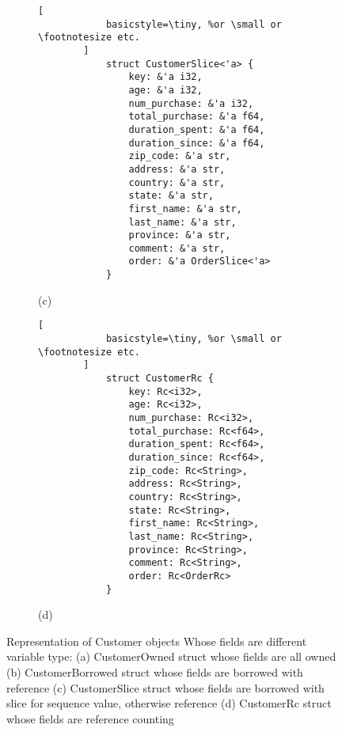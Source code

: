 \begin{figure}[htb]
    \begin{subfigure}{.5\textwidth}\centering
        \begin{lstlisting}[
            basicstyle=\tiny, %or \small or \footnotesize etc.
        ]
            struct CustomerSlice<'a> {
                key: &'a i32,
                age: &'a i32,
                num_purchase: &'a i32,
                total_purchase: &'a f64,
                duration_spent: &'a f64, 
                duration_since: &'a f64,
                zip_code: &'a str,
                address: &'a str,
                country: &'a str, 
                state: &'a str,
                first_name: &'a str,
                last_name: &'a str,
                province: &'a str,
                comment: &'a str,
                order: &'a OrderSlice<'a>
            }
        \end{lstlisting}
      \medskip
      \centerline{(c)}
    \end{subfigure}\hfill
    \begin{subfigure}{.5\linewidth}\centering
        \begin{lstlisting}[
            basicstyle=\tiny, %or \small or \footnotesize etc.
        ]
            struct CustomerRc {
                key: Rc<i32>,
                age: Rc<i32>,
                num_purchase: Rc<i32>,
                total_purchase: Rc<f64>,
                duration_spent: Rc<f64>,
                duration_since: Rc<f64>,
                zip_code: Rc<String>,
                address: Rc<String>,
                country: Rc<String>,
                state: Rc<String>,
                first_name: Rc<String>,
                last_name: Rc<String>,
                province: Rc<String>,
                comment: Rc<String>,
                order: Rc<OrderRc>
            }
        \end{lstlisting}
      \medskip
      \centerline{(d)}
    \end{subfigure}\hfill
    \caption{Representation of Customer objects Whose fields are different variable type: (a) CustomerOwned struct whose fields are all owned 
    (b) CustomerBorrowed struct whose fields are borrowed with reference (c) CustomerSlice struct whose fields are borrowed with slice for sequence value, otherwise reference 
    (d) CustomerRc struct whose fields are reference counting}
    \label{fig:customer}
 \end{figure}

